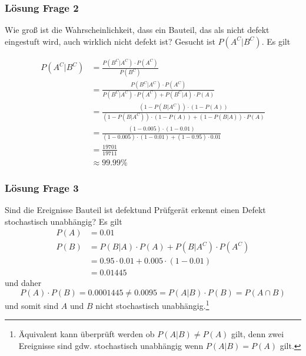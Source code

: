 \begin{frame}
\frametitle{Lösung Frage 2}
Wie groß ist die Wahrscheinlichkeit, dass ein Bauteil, das als nicht defekt eingestuft wird, auch wirklich nicht defekt ist?
Gesucht ist $P(A^C|B^C)$. Es gilt \pause

\begin{align*}
P(A^C|B^C) 	&= \frac{P(B^C|A^C)\cdot P(A^C)}{P(B^C)} \\
		&= \frac{P(B^C|A^C)\cdot P(A^C)}{P(B^C|A^C)\cdot P(A^C) + P(B^C|A) \cdot P(A)}\\
		&= \frac{(1-P(B|A^C))\cdot (1-P(A))}{(1-P(B|A^C))\cdot (1-P(A)) + (1-P(B|A)) \cdot P(A)}\\
		&= \frac{(1-0.005) \cdot (1-0.01)}{(1-0.005) \cdot (1-0.01) + (1-0.95) \cdot 0.01}\\
		&= \frac{19701}{19711}\\
		&\approx 99.99 \%
\end{align*}
\end{frame}
\begin{frame}
\frametitle{Lösung Frage 3}
Sind die Ereignisse \glqq Bauteil ist defekt\grqq und \glqq{} Prüfgerät erkennt einen Defekt\grqq{} stochastisch unabhängig?
Es gilt \pause
\begin{align*}
P(A) 	&= 0.01 \\
P(B) 	&= P(B|A)\cdot P(A) + P(B|A^C) \cdot P(A^C)\\
		&= 0.95 \cdot 0.01 + 0.005 \cdot (1-0.01)\\
		&= 0.01445
\end{align*}
und daher 
\[
P(A)\cdot P(B) = 0.0001445 \neq 0.0095 = P(A|B)\cdot P(B) = P(A\cap B) 
\]
und somit sind $A$ und $B$ nicht stochastisch unabhängig.\footnote{Äquivalent kann überprüft werden ob $P(A|B) \neq P(A)$ gilt, denn zwei Ereignisse sind gdw. stochastisch unabhängig wenn $P(A|B) = P(A)$ gilt.}
\end{frame}
